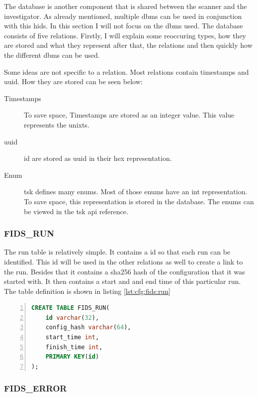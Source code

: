 \documentclass[
	a4paper,					%
	10pt,							%
	twoside,					%
	openright,				%
	notitlepage,			%
	parskip=half,			%
]{scrreprt}					%
\begin{document}
The database is another component that is shared between the scanner and the investigator. As already mentioned, multiple \gls{dbms} can be used in conjunction with this \gls{hids}. In this section I will not focus on the \gls{dbms} used. The database consists of five relations. Firstly, I will explain some reoccuring types, how they are stored and what they represent after that, the relations and then quickly how the different \gls{dbms} can be used. 

Some ideas are not specific to a relation. Most relations contain timestamps and \gls{uuid}. How they are stored can be seen below:

\begin{description}
	\item [Timestamps] To save space, Timestamps are stored as an integer value. This value represents the \gls{unixts}. 
	\item [\gls{uuid}] \gls{id} are stored as \gls{uuid} in their \gls{hex} representation. 
	\item [Enum] \gls{tsk} defines many enums. Most of those enums have an int representation. To save space, this representation is stored in the database. The enums can be viewed in the \gls{tsk} \gls{api} reference. \cite{tsk:file:header}
\end{description}

\subsubsection{FIDS\_RUN}

The run table is relatively simple. It contains a \gls{id} so that each run can be identified. This \gls{id} will be used in the other relations as well to create a link to the run. Besides that it contains a \gls{sha256} hash of the configuration that it was started with. It then contains a start and and end time of this particular run. The table definition is shown in listing \ref{lst:cfg:fids:run}

\begin{lstlisting}[language=sql, numbers=left, caption=Fids Run Table Definition, label=lst:cfg:fids:run]
CREATE TABLE FIDS_RUN(
	id varchar(32), 
	config_hash varchar(64), 
	start_time int, 
	finish_time int, 
	PRIMARY KEY(id)
);
\end{lstlisting}



\subsubsection{FIDS\_ERROR}
\end{document}
